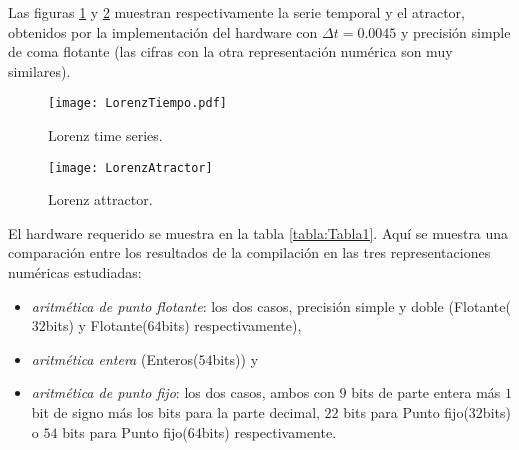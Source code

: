 Las figuras \ref{fig:tiempo} y \ref{fig:atractor} muestran respectivamente la serie temporal y el atractor, obtenidos por la implementación del hardware con $\Delta t = 0.0045$ y precisión simple de coma flotante (las cifras con la otra representación numérica son muy similares).
%
\begin{figure}
	\centering
	\texttt{[image: LorenzTiempo.pdf]}\\
	\caption{Lorenz time series.}\label{fig:tiempo}
\end{figure}
%
\begin{figure}
	\centering
	\texttt{[image: LorenzAtractor]}\\
	\caption{Lorenz attractor.}\label{fig:atractor}
\end{figure}

El hardware requerido se muestra en la tabla \ref{tabla:Tabla1}. Aquí se muestra una comparación entre los resultados de la compilación en las tres representaciones numéricas estudiadas:
\begin{itemize}
\item \textit{aritmética de punto flotante}: los dos casos, precisión simple y doble (Flotante($32$bits) y Flotante($64$bits) respectivamente),
\item \textit{aritmética entera} (Enteros($54$bits)) y
\item \textit{aritmética de punto fijo}: los dos casos, ambos con $9$ bits de parte entera más $1$ bit de signo más los bits para la parte decimal, $22$ bits para Punto fijo($32$bits) o $54$ bits para Punto fijo($64$bits) respectivamente.
\end{itemize}
%

